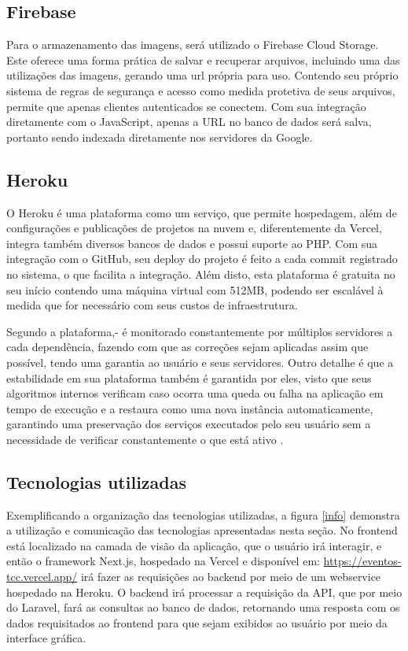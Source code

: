 \subsection{Firebase}
Para o armazenamento das imagens, será utilizado o Firebase Cloud Storage. Este oferece uma forma prática de salvar e recuperar arquivos, incluindo uma das utilizações das imagens, gerando uma url própria para uso. Contendo seu próprio sistema de regras de segurança e acesso como medida protetiva de seus arquivos, permite que apenas clientes autenticados se conectem. Com sua integração diretamente com o JavaScript, apenas a URL no banco de dados será salva, portanto sendo indexada diretamente nos servidores da Google.\cite{FIREBASE}

\subsection{Heroku}
O Heroku é uma plataforma como um serviço, que permite hospedagem, além de configurações e publicações de projetos na nuvem e, diferentemente da Vercel, integra também diversos bancos de dados e possui suporte ao PHP. Com sua integração com o GitHub, seu deploy do projeto é feito a cada commit registrado no sistema, o que facilita a integração. Além disto, esta plataforma é gratuita no seu início contendo uma máquina virtual com 512MB, podendo ser escalável à medida que for necessário com seus custos de infraestrutura. 

Segundo a plataforma,- é monitorado constantemente por múltiplos servidores a cada dependência, fazendo com que as correções sejam aplicadas assim que possível, tendo uma garantia ao usuário e seus servidores.  Outro detalhe é que a estabilidade em sua plataforma também é garantida por eles, visto que seus algoritmos internos verificam caso ocorra uma queda ou falha na aplicação em tempo de execução e a restaura como uma nova instância automaticamente, garantindo uma preservação dos serviços executados pelo seu usuário sem a necessidade de verificar constantemente o que está ativo \cite{HEROKU}.

\subsection{Tecnologias utilizadas}
Exemplificando a organização das tecnologias utilizadas, a figura \ref{info} demonstra a utilização e comunicação das tecnologias apresentadas nesta seção. No frontend está localizado na camada de visão da aplicação, que o usuário irá interagir, e então o framework Next.js, hospedado na Vercel e disponível em: \url{https://eventos-tcc.vercel.app/} irá fazer as requisições ao backend por meio de um webservice hospedado na Heroku. O backend irá processar a requisição da API, que por meio do Laravel, fará as consultas ao banco de dados, retornando uma resposta com os dados requisitados ao frontend para que sejam exibidos ao usuário por meio da interface gráfica.

